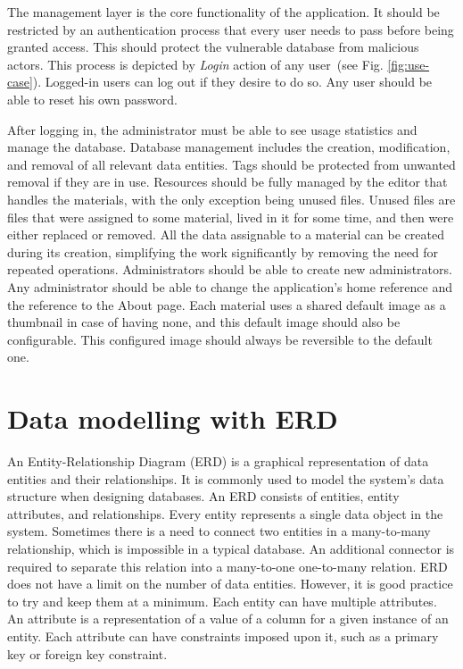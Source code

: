 \documentclass[
  digital,     %
  oneside,     %
  nosansbold,  %
  colorbold, %
  lof,         %
  lot,         %
]{fithesis4}
\newcommand{\imgref}[1]{(see Fig. \ref{fig:#1})}
\begin{document}
The management layer is the core functionality of the application. It should be restricted by an
authentication process that every user needs to pass before being granted access. This should
protect the vulnerable database from malicious actors. This process is depicted by \textit{Login}
action of any user~\imgref{use-case}. Logged-in users can log out if they desire to do so. Any user
should be able to reset his own password.

After logging in, the administrator must be able to see usage statistics and manage the database.
Database management includes the creation, modification, and removal of all relevant data entities.
Tags should be protected from unwanted removal if they are in use. Resources should be fully
managed by the editor that handles the materials, with the only exception being unused files. Unused
files are files that were assigned to some material, lived in it for some time, and then were either
replaced or removed. All the data assignable to a material can be created during its creation,
simplifying the work significantly by removing the need for repeated operations. Administrators
should be able to create new administrators. Any administrator should be able to change the
application's home reference and the reference to the About page. Each material uses a shared
default image as a thumbnail in case of having none, and this default image should also be
configurable. This configured image should always be reversible to the default one.

\section{Data modelling with ERD}

An Entity-Relationship Diagram (ERD) is a graphical representation of data entities and their
relationships. It is commonly used to model the system's data structure when designing databases.
An ERD consists of entities, entity attributes, and relationships. Every entity represents a single data
object in the system. Sometimes there is a need to connect two entities in a many-to-many
relationship, which is impossible in a typical database. An additional connector is required to separate
this relation into a many-to-one one-to-many relation. ERD does not have a limit on the number of
data entities. However, it is good practice to try and keep them at a minimum. Each entity can have
multiple attributes. An attribute is a representation of a value of a column for a given instance of an
entity. Each attribute can have constraints imposed upon it, such as a primary key or foreign key
constraint.
\end{document}
